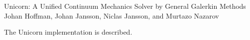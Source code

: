               {Unicorn: A Unified Continuum Mechanics Solver by General Galerkin Methods}
              {Johan Hoffman, Johan Jansson, Niclas Jansson, and Murtazo Nazarov}

\editornote{[hoffman-2]}

The Unicorn implementation is described.
